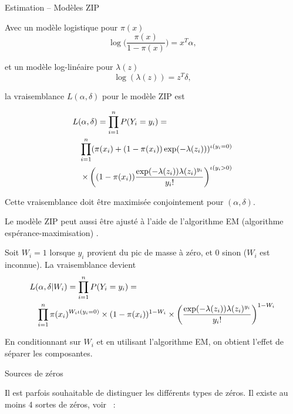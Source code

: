 \documentclass{BeamerTemplate}
\begin{document}
\begin{refsection}
\begin{frame}[allowframebreaks]{}
\end{frame}

\begin{frame}{Estimation -- Modèles ZIP}

Avec un modèle logistique pour $\pi(x)$
$$\log \Big(\frac{ \pi(x)}{1-\pi(x)} \Big) = x^T
\alpha,$$

et un modèle log-linéaire pour $\lambda(z)$
$$\log(\lambda(z)) = z^T \delta,$$

\bigskip la vraisemblance $L(\alpha,\delta)$ pour le modèle ZIP est
\end{frame}

\begin{frame}{}
\begin{eqnarray*}
\lefteqn{L(\alpha,\delta) = \prod_{i=1}^n P(Y_i = y_i) = }\\
&&\prod_{i=1}^n (\pi(x_i) +(1-\pi(x_i))\exp(-\lambda(z_i)))^{\iota(y_i=0)}
 \\
&& \times \left( (1-\pi(x_i))\frac{\exp(-\lambda(z_i))
\lambda(z_i)^{y_i}}{y_i!} \right)^{\iota(y_i>0)}
\end{eqnarray*}

\bigskip
Cette vraisemblance doit être maximisée conjointement pour $(\alpha,\delta)$.

\end{frame}


\begin{frame}{}
Le modèle ZIP peut aussi être ajusté à l'aide de l'algorithme EM (algorithme espérance-maximisation)
\cite{Demp:Lair:Rubi:1977}. 


\bigskip
Soit $W_i=1$ lorsque $y_i$ provient du pic de masse à zéro, et $0$ sinon ($W_i$ est
inconnue). La vraisemblance devient
\begin{eqnarray*}
\lefteqn{L(\alpha,\delta|W_i) = \prod_{i=1}^n P(Y_i = y_i) = }\\
&&\prod_{i=1}^n \pi(x_i)^{W_i \iota(y_i=0)} \times (1-\pi(x_i))^{1-W_i}
  \times \left( \frac{\exp(-\lambda(z_i))
\lambda(z_i)^{y_i}}{y_i!} \right)^{1-W_i}
\end{eqnarray*}

\bigskip
En conditionnant sur $W_i$ et en utilisant l'algorithme EM, on obtient l'effet de séparer les composantes. 
\end{frame}

\begin{frame}{Sources de zéros}

Il est parfois souhaitable de distinguer les différents types de zéros. Il existe au moins 4 sortes de zéros, voir ~: 



\end{frame}
\end{refsection}
\end{document}
